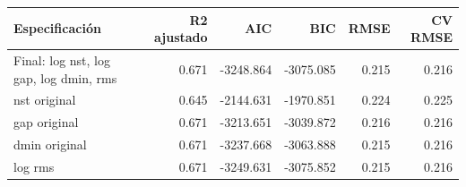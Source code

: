 \begin{tabular}{lrrrrr}
\toprule
Especificación & R2 ajustado & AIC & BIC & RMSE & CV RMSE \\
\midrule
Final: log nst, log gap, log dmin, rms & 0.671 & -3248.864 & -3075.085 & 0.215 & 0.216 \\
nst original & 0.645 & -2144.631 & -1970.851 & 0.224 & 0.225 \\
gap original & 0.671 & -3213.651 & -3039.872 & 0.216 & 0.216 \\
dmin original & 0.671 & -3237.668 & -3063.888 & 0.215 & 0.216 \\
log rms & 0.671 & -3249.631 & -3075.852 & 0.215 & 0.216 \\
\bottomrule
\end{tabular}
